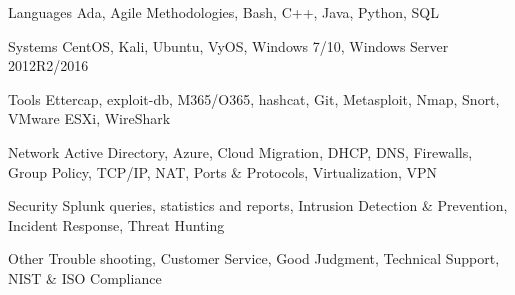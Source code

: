 



\begin{cvskills}
  \cvskill
    {Languages} %
     {Ada, Agile Methodologies, Bash, C++, Java, Python, SQL} %

  \cvskill
    {Systems} %
    {CentOS, Kali, Ubuntu, VyOS, Windows 7/10, Windows Server 2012R2/2016}

  \cvskill
     {Tools}
     {Ettercap, exploit-db, M365/O365, hashcat, Git, Metasploit, Nmap, Snort, VMware ESXi, WireShark}

  \cvskill
     {Network}
     {Active Directory, Azure, Cloud Migration, DHCP, DNS, Firewalls, Group Policy, TCP/IP, NAT, Ports \& Protocols, Virtualization, VPN }

  \cvskill
     {Security}
     {Splunk queries, statistics and reports, Intrusion Detection \& Prevention, Incident Response, Threat Hunting}

  \cvskill
     {Other}
     {Trouble shooting, Customer Service, Good Judgment, Technical Support, NIST \& ISO Compliance}



\end{cvskills}
